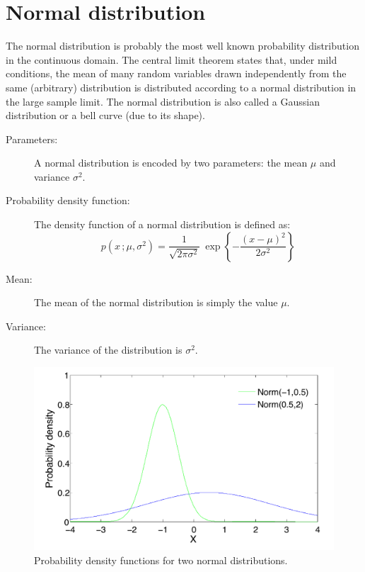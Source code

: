 \section*{Normal distribution}

The normal distribution is probably the most well known probability distribution in the continuous domain. The central limit theorem states that, under mild conditions, the mean of many random variables drawn independently from the same (arbitrary) distribution is distributed according to a normal distribution in the large sample limit.  The normal distribution is also called a Gaussian distribution or a bell curve (due to its shape). 


\begin{description}
\item [Parameters: ] A normal distribution is encoded by two parameters: the mean $\mu$ and  variance $\sigma^2$. 

\item [Probability density function: ] The density function of a normal distribution is defined as:
\begin{equation}
p(x \,; \mu,\sigma^2) = \frac{1}{\sqrt{2\pi\sigma^2}}\ \operatorname{exp}\left\{-\frac{\left(x-\mu\right)^2}{2\sigma^2}\right\}
\end{equation}
\item [Mean: ] The mean of the normal distribution is simply the value $\mu$.

\item [Variance: ] The variance of the distribution is $\sigma^2$.

\end{description}

\begin{figure}[h!]
\centering
\includegraphics[scale=0.40]{imgs/norm_appendix.pdf}
\caption{Probability density functions for two normal distributions.} 
\label{fig:norm-appendix}
\end{figure}

